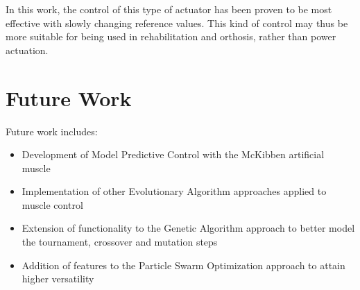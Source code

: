 In this work, the control of this type of actuator has been proven to be most effective
with slowly changing reference values. This kind of control may thus be more suitable
for being used in rehabilitation and orthosis, rather than power actuation.

\clearpage

\section{Future Work}

Future work includes:

\begin{itemize}[noitemsep]
	\item Development of Model Predictive Control with the McKibben artificial muscle
	\item Implementation of other Evolutionary Algorithm approaches applied to muscle control
	\item Extension of functionality to the Genetic Algorithm approach to better model the tournament, crossover and mutation steps
	\item Addition of features to the Particle Swarm Optimization approach to attain higher versatility
\end{itemize}